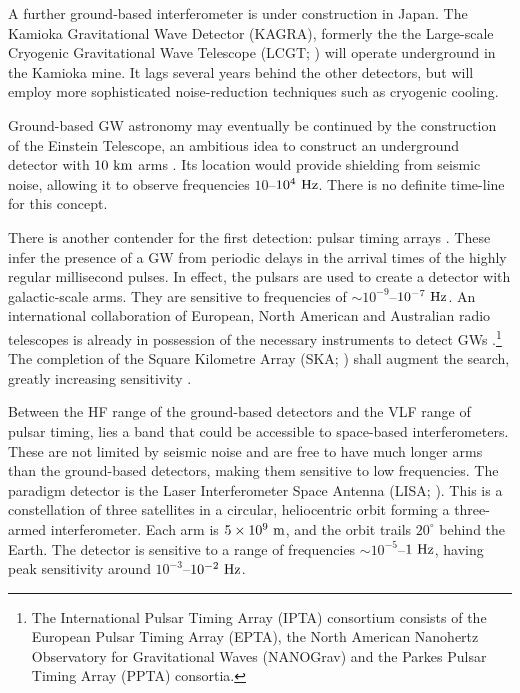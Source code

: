 A further ground-based interferometer is under construction in Japan. The Kamioka Gravitational Wave Detector (KAGRA), formerly the the Large-scale Cryogenic Gravitational Wave Telescope (LCGT; \citealt{Kuroda1999,Kuroda2010}) will operate underground in the Kamioka mine. It lags several years behind the other detectors, but will employ more sophisticated noise-reduction techniques such as cryogenic cooling.

Ground-based GW astronomy may eventually be continued by the construction of the Einstein Telescope, an ambitious idea to construct an underground detector with $10~\mathrm{km}$ arms \citep{Punturo2010,Hild2011,Sathyaprakash2012}. Its location would provide shielding from seismic noise, allowing it to observe frequencies $10$--$10^4~\mathrm{Hz}$. There is no definite time-line for this concept.

There is another contender for the first detection: pulsar timing arrays \citep{McWilliams2012,Sesana2012a}. These infer the presence of a GW from periodic delays in the arrival times of the highly regular millisecond pulses. In effect, the pulsars are used to create a detector with galactic-scale arms. They are sensitive to frequencies of $\sim10^{-9}$--$10^{-7}~\mathrm{Hz}$. An international collaboration of European, North American and Australian radio telescopes is already in possession of the necessary instruments to detect GWs \citep{Hobbs2010}.\footnote{The International Pulsar Timing Array (IPTA) consortium consists of the European Pulsar Timing Array (EPTA), the North American Nanohertz Observatory for Gravitational Waves (NANOGrav) and the Parkes Pulsar Timing Array (PPTA) consortia.} The completion of the Square Kilometre Array (SKA; \citealt{Dewdney2009}) shall augment the search, greatly increasing sensitivity \citep{Kramer2004}.

Between the HF range of the ground-based detectors and the VLF range of pulsar timing, lies a band that could be accessible to space-based interferometers. These are not limited by seismic noise and are free to have much longer arms than the ground-based detectors, making them sensitive to low frequencies. The paradigm detector is the Laser Interferometer Space Antenna (LISA; \citealt{Bender1998, Danzmann2003}). This is a constellation of three satellites in a circular, heliocentric orbit forming a three-armed interferometer. Each arm is $5 \times 10^9~\mathrm{m}$, and the orbit trails $20^{\circ}$ behind the Earth. The detector is sensitive to a range of frequencies $\sim10^{-5}$--$1~\mathrm{Hz}$, having peak sensitivity around $10^{-3}$--$10^{-2}~\mathrm{Hz}$.

